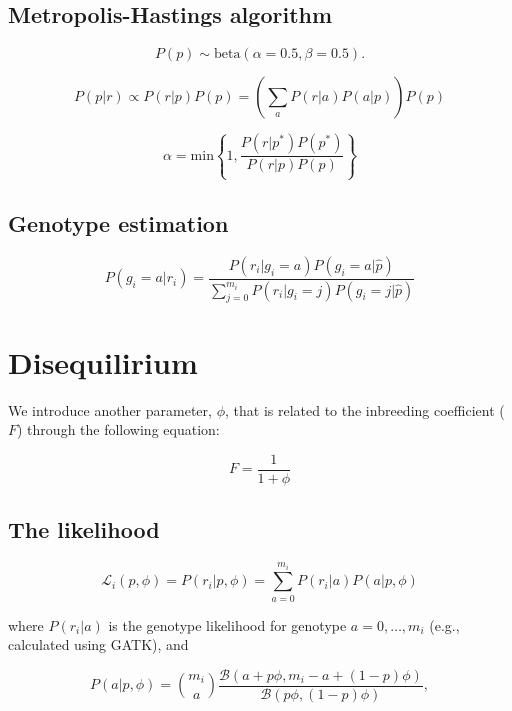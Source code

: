 \documentclass[11pt,english,letterpaper,oneside]{article}
\begin{document}
\subsection{Metropolis-Hastings algorithm}

\begin{equation}
P(p) \sim \text{beta}(\alpha = 0.5, \beta = 0.5).
\end{equation}

\begin{equation}
P(p|r) \propto P(r|p)P(p) = \left(\sum_a P(r|a)P(a|p)\right)P(p)
\end{equation}

\begin{equation}
\alpha = \text{min} \left\{1, \frac{P(r|p^*)P(p^*)}{P(r|p)P(p)} \right\}
\end{equation}

\subsection{Genotype estimation}

\begin{equation}
P(g_i = a|r_i) = \frac{P(r_i|g_i = a)P(g_i = a|\hat{p})}{\sum_{j=0}^{m_i}P(r_i|g_i = j)P(g_i = j|\hat{p})}
\end{equation}

\section{Disequilirium}

We introduce another parameter, $\phi$, that is related to the inbreeding coefficient ($F$) through the following equation:

\begin{equation}
F = \frac{1}{1 + \phi}
\end{equation}

\subsection{The likelihood}

\begin{equation}
\mathcal{L}_i(p,\phi) = P(r_i|p,\phi) = \sum_{a=0}^{m_i} P(r_i|a)P(a|p,\phi)
\end{equation}

where $P(r_i|a)$ is the genotype likelihood for genotype $a = 0,\dots,m_i$ (e.g., calculated using GATK), and 

\begin{equation*}
P(a | p,\phi) = \binom{m_i}{a} \frac{\mathcal{B}(a + p\phi, m_i - a + (1 - p)\phi)}{\mathcal{B}(p\phi, (1 - p)\phi)},
\end{equation*}
\end{document}
